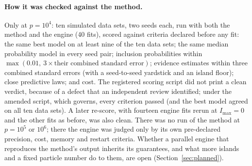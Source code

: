 \paragraph{How it was checked against the method.} Only at $p=10^4$: ten simulated data sets, two seeds each, run with both
the method and the engine (40 fits), scored against criteria declared before any fit: the same best model on at least
nine of the ten data sets; the same median probability model in every seed pair; inclusion probabilities within
$\max(0.01,\ 3\times\text{their combined standard error})$; evidence estimates within three combined standard errors (with a seed-to-seed
yardstick and an island floor); close predictive laws; and cost. The registered scoring script did not print a clean
verdict, because of a defect that an independent review identified; under the amended script, which governs, every
criterion passed (and the best model agreed on all ten data sets). A later re-score, with fourteen engine fits rerun at
$I_{\max}=0$ and the other fits as before, was also clean. There was
no run of the method at $p=10^5$ or $10^6$; there the engine was judged only by its own pre-declared precision, cost,
memory and restart criteria. Whether a parallel engine that reproduces the method's output inherits its guarantees, and
what more islands and a fixed particle number do to them, are open (Section~\ref{sec:planned}).
